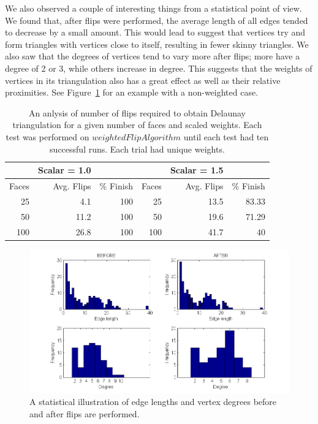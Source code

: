 \documentclass[12pt]{article}
\begin{document}
\noindent We also observed a couple of interesting things from a statistical point of view. We found that, after flips were performed, the average length of all edges tended to decrease by a small amount. This would lead to suggest that vertices try and form triangles with vertices close to itself, resulting in fewer skinny triangles. We also saw that the degrees of vertices tend to vary more after flips; more have a degree of 2 or 3, while others increase in degree. This suggests that the weights of vertices in its triangulation also has a great effect as well as their relative proximities. See Figure~\ref{stats} for an example with a non-weighted case.\newline
\begin{table}
\begin{center}
\begin{tabular}{|rrr|rrr|}
 \hline
 &Scalar = 1.0      &            &            &  Scalar = 1.5           &          \\ \hline

   Faces & Avg. Flips & \% Finish &               Faces & Avg. Flips & \% Finish \\ \hline

        25 &        4.1 &        100 &                    25 &       13.5 &      83.33 \\

        50 &       11.2 &        100 &                     50 &       19.6 &      71.29 \\

       100 &       26.8 &        100 &                   100 &       41.7 &         40 \\ \hline

\end{tabular} 
\end{center}
\caption{An anlysis of number of flips required to obtain Delaunay triangulation for a given number of faces and scaled weights. Each test was performed on $weightedFlipAlgorithm$ until each test had ten successful runs. Each trial had unique weights.} 
\label{DAT}
\end{table} 

\begin{figure}
\centering
\includegraphics[scale = 0.6]{Pictures/Stats.png}
\caption{A statistical illustration of edge lengths and vertex degrees before and after flips are performed.}
\label{stats}
\end{figure}
\end{document}
